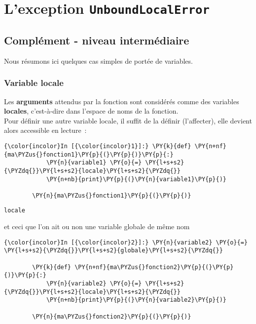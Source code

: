     \hypertarget{lexception-unboundlocalerror}{%
\section{\texorpdfstring{L'exception
\texttt{UnboundLocalError}}{L'exception UnboundLocalError}}\label{lexception-unboundlocalerror}}

    \hypertarget{compluxe9ment---niveau-intermuxe9diaire}{%
\subsection{Complément - niveau
intermédiaire}\label{compluxe9ment---niveau-intermuxe9diaire}}

    Nous résumons ici quelques cas simples de portée de variables.

    \hypertarget{variable-locale}{%
\subsubsection{Variable locale}\label{variable-locale}}

    Les \textbf{arguments} attendus par la fonction sont considérés comme
des variables \textbf{locales}, c'est-à-dire dans l'espace de noms de la
fonction.\\

Pour définir une autre variable locale, il suffit de la définir
(l'affecter), elle devient alors accessible en lecture~:

    \begin{Verbatim}[commandchars=\\\{\}]
{\color{incolor}In [{\color{incolor}1}]:} \PY{k}{def} \PY{n+nf}{ma\PYZus{}fonction1}\PY{p}{(}\PY{p}{)}\PY{p}{:}
            \PY{n}{variable1} \PY{o}{=} \PY{l+s+s2}{\PYZdq{}}\PY{l+s+s2}{locale}\PY{l+s+s2}{\PYZdq{}}
            \PY{n+nb}{print}\PY{p}{(}\PY{n}{variable1}\PY{p}{)}
        
        \PY{n}{ma\PYZus{}fonction1}\PY{p}{(}\PY{p}{)}
\end{Verbatim}


    \begin{Verbatim}[commandchars=\\\{\}]
locale

    \end{Verbatim}

    et ceci que l'on ait ou non une variable globale de même nom

    \begin{Verbatim}[commandchars=\\\{\}]
{\color{incolor}In [{\color{incolor}2}]:} \PY{n}{variable2} \PY{o}{=} \PY{l+s+s2}{\PYZdq{}}\PY{l+s+s2}{globale}\PY{l+s+s2}{\PYZdq{}}
        
        \PY{k}{def} \PY{n+nf}{ma\PYZus{}fonction2}\PY{p}{(}\PY{p}{)}\PY{p}{:}
            \PY{n}{variable2} \PY{o}{=} \PY{l+s+s2}{\PYZdq{}}\PY{l+s+s2}{locale}\PY{l+s+s2}{\PYZdq{}}
            \PY{n+nb}{print}\PY{p}{(}\PY{n}{variable2}\PY{p}{)}
        
        \PY{n}{ma\PYZus{}fonction2}\PY{p}{(}\PY{p}{)}
\end{Verbatim}


